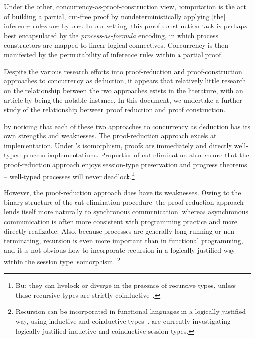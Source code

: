 Under the other, concurrency-as-proof-construction view, computation is the act of building a partial, cut-free proof by nondeterministically applying [the] inference rules one by one.
In our setting, this proof construction tack is perhaps best encapsulated by the \emph{process-as-formula} encoding, in which process constructors are mapped to linear logical connectives\autocite{Miller:ELP92}.
Concurrency is then manifested by the permutability of inference rules within a partial proof.


Despite the various research efforts into proof-reduction and proof-con\-struc\-tion approaches to concurrency as deduction, it appears that relatively little research on the relationship between the two approaches exists in the literature, with an article by \citeauthor{Cervesato+Scedrov:IC09} being the notable instance.\autocite{Cervesato+Scedrov:IC09}
In this document, we undertake a further study of the relationship between proof reduction and proof construction.

 by noticing that
%
each of these two approaches to concurrency as deduction has its own strengths and weaknesses.
The proof-reduction approach excels at
implementation.
Under \citeauthor{Caires+:MSCS16}'s isomorphism, proofs are immediately and directly well-typed process implementations.\autocites{Toninho+:ESOP13}{Griffith:UIUC16}
Properties of cut elimination also ensure that the proof-reduction approach enjoys session-type preservation and progress theorems -- well-typed processes will never deadlock.\footnote{But they can livelock or diverge in the presence of recursive types, unless those recursive types are strictly coinductive~\parencite{Derakhshan+Pfenning:LMCS20}.}

However, the proof-reduction approach does have its weaknesses.
Owing to the binary structure of the cut elimination procedure, the proof-reduction approach lends itself more naturally to synchronous communication, whereas asynchronous communication is often more consistent with programming practice and more directly realizable.
Also, because processes are generally long-running or non-terminating, recursion is even more important than in functional programming, and it is not obvious how to incorporate recursion in a logically justified way within the session type isomorphism.%
\footnote{Recursion can be incorporated in functional languages in a logically justified way, using inductive and coinductive types~\parencite{Mendler:LICS87}.
\Textcites{Derakhshan+Pfenning:LMCS20}{Somayyajula+Pfenning:20} are currently investigating logically justified inductive and coinductive session types.}


